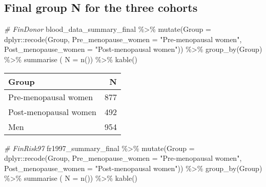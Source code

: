 \documentclass[
]{article}
\newenvironment{Shaded}{\begin{snugshade}}{\end{snugshade}}
\newcommand{\AttributeTok}[1]{\textcolor[rgb]{0.77,0.63,0.00}{#1}}
\newcommand{\CommentTok}[1]{\textcolor[rgb]{0.56,0.35,0.01}{\textit{#1}}}
\newcommand{\FunctionTok}[1]{\textcolor[rgb]{0.00,0.00,0.00}{#1}}
\newcommand{\NormalTok}[1]{#1}
\newcommand{\SpecialCharTok}[1]{\textcolor[rgb]{0.00,0.00,0.00}{#1}}
\newcommand{\StringTok}[1]{\textcolor[rgb]{0.31,0.60,0.02}{#1}}
\begin{document}
\hypertarget{final-group-n-for-the-three-cohorts}{%
\subsection{Final group N for the three
cohorts}\label{final-group-n-for-the-three-cohorts}}

\begin{Shaded}
\begin{Highlighting}[]
\CommentTok{\# FinDonor}
\NormalTok{blood\_data\_summary\_final }\SpecialCharTok{\%\textgreater{}\%} 
   \FunctionTok{mutate}\NormalTok{(}\AttributeTok{Group =}\NormalTok{ dplyr}\SpecialCharTok{::}\FunctionTok{recode}\NormalTok{(Group, }\AttributeTok{Pre\_menopause\_women =} \StringTok{"Pre{-}menopausal women"}\NormalTok{,}
         \AttributeTok{Post\_menopause\_women =} \StringTok{"Post{-}menopausal women"}\NormalTok{)) }\SpecialCharTok{\%\textgreater{}\%} 
  \FunctionTok{group\_by}\NormalTok{(Group) }\SpecialCharTok{\%\textgreater{}\%} 
  \FunctionTok{summarise}\NormalTok{ ( }\AttributeTok{N =} \FunctionTok{n}\NormalTok{()) }\SpecialCharTok{\%\textgreater{}\%} 
  \FunctionTok{kable}\NormalTok{() }
\end{Highlighting}
\end{Shaded}

\begin{tabular}{l|r}
\hline
Group & N\\
\hline
Pre-menopausal women & 877\\
\hline
Post-menopausal women & 492\\
\hline
Men & 954\\
\hline
\end{tabular}

\begin{Shaded}
\begin{Highlighting}[]
\CommentTok{\# FinRisk97}
\NormalTok{fr1997\_summary\_final }\SpecialCharTok{\%\textgreater{}\%} 
   \FunctionTok{mutate}\NormalTok{(}\AttributeTok{Group =}\NormalTok{ dplyr}\SpecialCharTok{::}\FunctionTok{recode}\NormalTok{(Group, }\AttributeTok{Pre\_menopause\_women =} \StringTok{"Pre{-}menopausal women"}\NormalTok{,}
         \AttributeTok{Post\_menopause\_women =} \StringTok{"Post{-}menopausal women"}\NormalTok{)) }\SpecialCharTok{\%\textgreater{}\%} 
  \FunctionTok{group\_by}\NormalTok{(Group) }\SpecialCharTok{\%\textgreater{}\%} 
  \FunctionTok{summarise}\NormalTok{ ( }\AttributeTok{N =} \FunctionTok{n}\NormalTok{()) }\SpecialCharTok{\%\textgreater{}\%} 
  \FunctionTok{kable}\NormalTok{() }
\end{Highlighting}
\end{Shaded}
\end{document}
